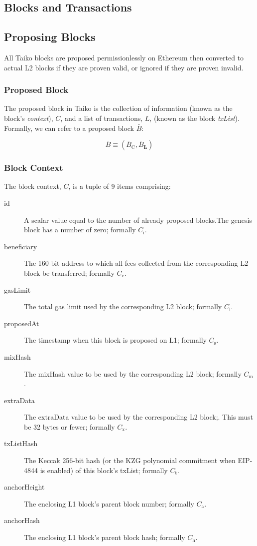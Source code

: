 \documentclass[9pt,oneside]{amsart}
\begin{document}
\begin{multicols}{2}
\section{Blocks and Transactions}

\subsection{Proposing Blocks}
All Taiko blocks are proposed permissionlessly on Ethereum then converted to actual L2 blocks if they are proven valid, or ignored if they are proven invalid.

\subsubsection{Proposed Block} The proposed block in Taiko is the collection of information (known as the block's \textit{context}), $C$, and a list of transactions, $L$,  (known as the block \textit{txList}). Formally, we can refer to a proposed block $\bar{B}$:

\begin{equation}
\bar{B} \equiv (\bar{B}_{\mathrm{C}}, \bar{B}_{\mathbf{L}})
\end{equation}

\subsubsection{Block Context} The block context, $C$, is a tuple of 9 items comprising:


\begin{description}
\item[id] A scalar value equal to the number of already proposed blocks.The genesis block has a number of zero; formally $C_{\mathrm{i}}$.
\item[beneficiary] The 160-bit address to which all fees collected from the corresponding L2 block be transferred; formally $C_{\mathrm{c}}$.
\item[gasLimit] The total gas limit used by the corresponding L2 block; formally $C_{\mathrm{l}}$.
\item[proposedAt] The timestamp when this block is proposed on L1; formally $C_{\mathrm{s}}$.
\item[mixHash] The mixHash value to be used by the corresponding L2 block; formally $C_{\mathrm{m}}$.
\item[extraData] The extraData value to be used by the corresponding L2 block;. This must be 32 bytes or fewer; formally $C_{\mathrm{x}}$.
\item[txListHash] The Keccak 256-bit hash (or the KZG polynomial commitment when EIP-4844 is enabled) of this block's txList; formally $C_{\mathrm{t}}$. 
\item[anchorHeight] The enclosing L1 block's parent block number; formally $C_{\mathrm{a}}$.
\item[anchorHash] The enclosing L1 block's parent block hash; formally $C_{\mathrm{h}}$.
\end{description}


\end{multicols}
\end{document}
